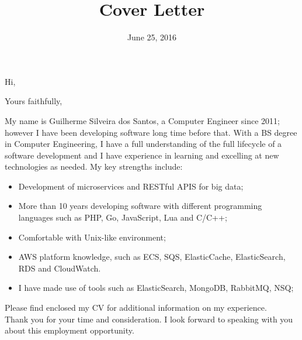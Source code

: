 \documentclass[11pt,a4paper,sans]{moderncv}        %
\title{Cover Letter}                               %
\begin{document}
\recipient{}{}
\date{June 25, 2016}
\opening{Hi,}
\closing{Yours faithfully,}
\maketitle

My name is Guilherme Silveira dos Santos, a Computer Engineer since 2011; however I have been developing software long time before that. With a BS degree in Computer Engineering, I have a full understanding of the full lifecycle of a software development and I have experience in learning and excelling at new technologies as needed. My key strengths include:\\

\begin{itemize}
    \item Development of microservices and RESTful APIS for big data;
    \item More than 10 years developing software with different programming languages such as PHP, Go, JavaScript, Lua and C/C++;
    \item Comfortable with Unix-like environment;
    \item AWS platform knowledge, such as ECS, SQS, ElasticCache, ElasticSearch, RDS and CloudWatch.
    \item I have made use of tools such as ElasticSearch, MongoDB, RabbitMQ, NSQ;
\end{itemize}
\vspace{5mm}
Please find enclosed my CV for additional information on my experience.\\
 
Thank you for your time and consideration. I look forward to speaking with you about this employment opportunity.


\vspace{8mm}

\makeletterclosing
\end{document}
